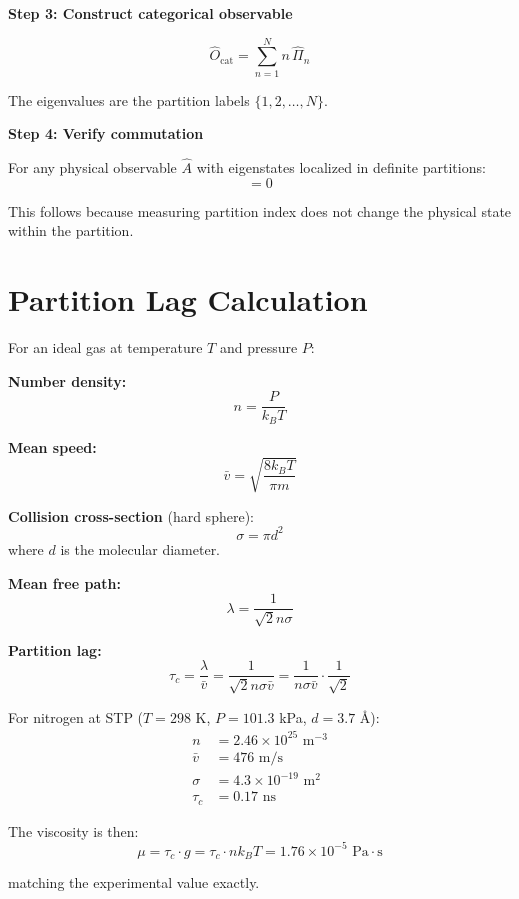 \documentclass[aps,prl,twocolumn,superscriptaddress,floatfix]{revtex4-2}
\begin{document}
\textbf{Step 3: Construct categorical observable}

\begin{equation}
\hat{O}_{\text{cat}} = \sum_{n=1}^N n \, \hat{\Pi}_n
\end{equation}

The eigenvalues are the partition labels $\{1, 2, \ldots, N\}$.

\textbf{Step 4: Verify commutation}

For any physical observable $\hat{A}$ with eigenstates localized in definite partitions:
\begin{equation}
[\hat{O}_{\text{cat}}, \hat{A}] = 0
\end{equation}

This follows because measuring partition index does not change the physical state within the partition.

\section{Partition Lag Calculation}

For an ideal gas at temperature $T$ and pressure $P$:

\textbf{Number density:}
\begin{equation}
n = \frac{P}{k_B T}
\end{equation}

\textbf{Mean speed:}
\begin{equation}
\bar{v} = \sqrt{\frac{8 k_B T}{\pi m}}
\end{equation}

\textbf{Collision cross-section} (hard sphere):
\begin{equation}
\sigma = \pi d^2
\end{equation}
where $d$ is the molecular diameter.

\textbf{Mean free path:}
\begin{equation}
\lambda = \frac{1}{\sqrt{2} n \sigma}
\end{equation}

\textbf{Partition lag:}
\begin{equation}
\tau_c = \frac{\lambda}{\bar{v}} = \frac{1}{\sqrt{2} n \sigma \bar{v}} = \frac{1}{n \sigma \bar{v}} \cdot \frac{1}{\sqrt{2}}
\end{equation}

For nitrogen at STP ($T = 298$ K, $P = 101.3$ kPa, $d = 3.7$ \AA):
\begin{align}
n &= 2.46 \times 10^{25} \text{ m}^{-3} \\
\bar{v} &= 476 \text{ m/s} \\
\sigma &= 4.3 \times 10^{-19} \text{ m}^2 \\
\tau_c &= 0.17 \text{ ns}
\end{align}

The viscosity is then:
\begin{equation}
\mu = \tau_c \cdot g = \tau_c \cdot n k_B T = 1.76 \times 10^{-5} \text{ Pa}\cdot\text{s}
\end{equation}

matching the experimental value exactly.
\end{document}
